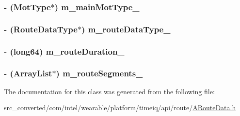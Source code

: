 \subsubsection[{m\+\_\+main\+Mot\+Type\+\_\+}]{\setlength{\rightskip}{0pt plus 5cm}-\/ (Mot\+Type$\ast$) m\+\_\+main\+Mot\+Type\+\_\+}\label{interface_a_route_data_ab09074b4f92fa23a20ef081a90e426bb}
\hypertarget{interface_a_route_data_ac67dd664469f96eef6892486da7a80d5}{}
\subsubsection[{m\+\_\+route\+Data\+Type\+\_\+}]{\setlength{\rightskip}{0pt plus 5cm}-\/ ({\bf Route\+Data\+Type}$\ast$) m\+\_\+route\+Data\+Type\+\_\+}\label{interface_a_route_data_ac67dd664469f96eef6892486da7a80d5}
\hypertarget{interface_a_route_data_aa612b37466c55d5f97a401495ea7ef7f}{}
\subsubsection[{m\+\_\+route\+Duration\+\_\+}]{\setlength{\rightskip}{0pt plus 5cm}-\/ (long64) m\+\_\+route\+Duration\+\_\+}\label{interface_a_route_data_aa612b37466c55d5f97a401495ea7ef7f}
\hypertarget{interface_a_route_data_a5e80a8c6042bc60e66ef4c2c136e0f43}{}
\subsubsection[{m\+\_\+route\+Segments\+\_\+}]{\setlength{\rightskip}{0pt plus 5cm}-\/ (Array\+List$\ast$) m\+\_\+route\+Segments\+\_\+}\label{interface_a_route_data_a5e80a8c6042bc60e66ef4c2c136e0f43}


The documentation for this class was generated from the following file\+:\begin{DoxyCompactItemize}
\item 
src\+\_\+converted/com/intel/wearable/platform/timeiq/api/route/\hyperlink{_a_route_data_8h}{A\+Route\+Data.\+h}\end{DoxyCompactItemize}
